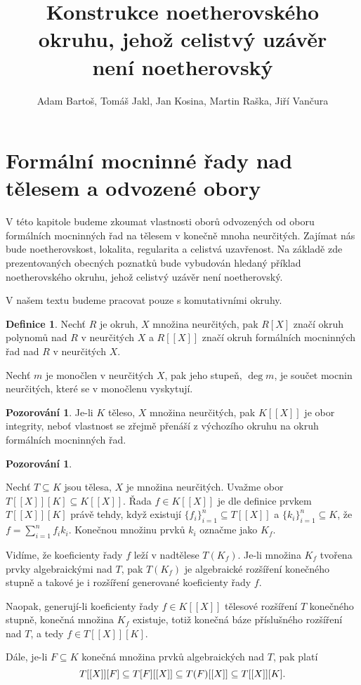 \documentclass[11pt,a4paper]{article}
\title{Konstrukce noetherovského okruhu, jehož celistvý uzávěr\\ není noetherovský}
\author{Adam Bartoš, Tomáš Jakl, Jan Kosina, Martin Raška, Jiří Vančura}
\newcommand*{\ml}[1]{\[\textstyle\let\displaystyle\textstyle#1\]}	%
\newcounter{numb}
\theoremstyle{definition}
\newtheorem*{definice}{Definice}
\newtheorem{pozorovani}[numb]{Pozorování}
\theoremstyle{plain}
\begin{document}
\maketitle


\section{Formální mocninné řady nad tělesem a odvozené obory}

V této kapitole budeme zkoumat vlastnosti oborů odvozených od oboru formálních mocninných řad na tělesem v konečně mnoha neurčitých. Zajímat nás bude noetherovskost, lokalita, regularita a celistvá uzavřenost. Na základě zde prezentovaných obecných poznatků bude vybudován hledaný příklad noetherovského okruhu, jehož celistvý uzávěr není noetherovský.

V našem textu budeme pracovat pouze s komutativními okruhy.

\begin{definice}
	Nechť $R$ je okruh, $X$ množina neurčitých, pak $R[X]$ značí okruh polynomů nad $R$ v neurčitých $X$ a $R[[X]]$ značí okruh formálních mocninných řad nad $R$ v neurčitých $X$.
	
	Nechť $m$ je monočlen v neurčitých $X$, pak jeho stupeň, $\deg m$, je součet mocnin neurčitých, které se v monočlenu vyskytují.
\end{definice}

\begin{pozorovani}
	Je-li $K$ těleso, $X$ množina neurčitých, pak $K[[X]]$ je obor integrity, neboť vlastnost  se zřejmě přenáší z výchozího okruhu na okruh formálních mocninných řad.
\end{pozorovani}

\begin{pozorovani} \label{thm:TXK}
	\newcommand*{\I}{_{i = 1}^n}

	Nechť $T \subseteq K$ jsou tělesa, $X$ je množina neurčitých. Uvažme obor $T[[X]][K] \subseteq K[[X]]$. Řada $f \in K[[X]]$ je dle definice prvkem $T[[X]][K]$ právě tehdy, když existují $\{f_i\}\I \subseteq T[[X]]$ a $\{k_i\}\I \subseteq K$, že $f = \sum\I f_i k_i$. Konečnou množinu prvků $k_i$ označme jako $K_f$.

	Vidíme, že koeficienty řady $f$ leží v nadtělese $T(K_f)$. Je-li množina $K_f$ tvořena prvky algebraickými nad $T$, pak $T(K_f)$ je algebraické rozšíření konečného stupně a takové je i rozšíření generované koeficienty řady $f$.

	Naopak, generují-li koeficienty řady $f \in K[[X]]$ tělesové rozšíření $T$ konečného stupně, konečná množina $K_f$ existuje, totiž konečná báze příslušného rozšíření nad $T$, a tedy $f \in T[[X]][K]$.

	Dále, je-li $F \subseteq K$ konečná množina prvků algebraických nad $T$, pak platí
	\ml{
		T[[X]][F] \subseteq T[F][[X]] \subseteq T(F)[[X]] \subseteq T[[X]][K].
	}
\end{pozorovani}
\end{document}
